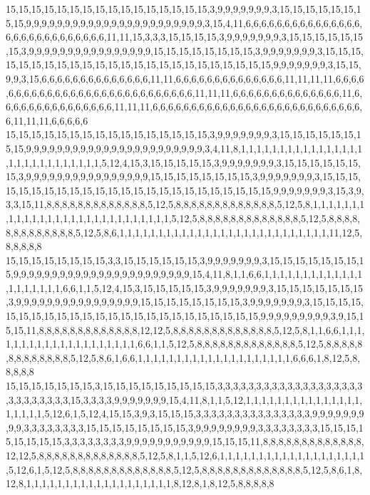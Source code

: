15,15,15,15,15,15,15,15,15,15,15,15,15,15,15,15,3,9,9,9,9,9,9,9,3,15,15,15,15,15,15,15,15,9,9,9,9,9,9,9,9,9,9,9,9,9,9,9,9,9,9,9,9,9,9,9,3,15,4,11,6,6,6,6,6,6,6,6,6,6,6,6,6,6,6,6,6,6,6,6,6,6,6,6,6,6,6,6,11,11,15,3,3,3,15,15,15,15,3,9,9,9,9,9,9,9,3,15,15,15,15,15,15,15,3,9,9,9,9,9,9,9,9,9,9,9,9,9,9,9,9,15,15,15,15,15,15,15,15,3,9,9,9,9,9,9,9,3,15,15,15,15,15,15,15,15,15,15,15,15,15,15,15,15,15,15,15,15,15,15,15,15,9,9,9,9,9,9,9,3,15,15,9,9,3,15,6,6,6,6,6,6,6,6,6,6,6,6,6,6,11,11,6,6,6,6,6,6,6,6,6,6,6,6,6,6,11,11,11,11,6,6,6,6,6,6,6,6,6,6,6,6,6,6,6,6,6,6,6,6,6,6,6,6,6,6,6,6,11,11,11,6,6,6,6,6,6,6,6,6,6,6,6,6,6,11,6,6,6,6,6,6,6,6,6,6,6,6,6,6,6,11,11,11,6,6,6,6,6,6,6,6,6,6,6,6,6,6,6,6,6,6,6,6,6,6,6,6,6,6,6,6,11,11,11,6,6,6,6,6
15,15,15,15,15,15,15,15,15,15,15,15,15,15,15,15,3,9,9,9,9,9,9,9,3,15,15,15,15,15,15,15,15,9,9,9,9,9,9,9,9,9,9,9,9,9,9,9,9,9,9,9,9,9,9,9,3,4,11,8,1,1,1,1,1,1,1,1,1,1,1,1,1,1,1,1,1,1,1,1,1,1,1,1,1,1,1,1,5,12,4,15,3,15,15,15,15,15,3,9,9,9,9,9,9,9,3,15,15,15,15,15,15,15,3,9,9,9,9,9,9,9,9,9,9,9,9,9,9,9,9,15,15,15,15,15,15,15,15,3,9,9,9,9,9,9,9,3,15,15,15,15,15,15,15,15,15,15,15,15,15,15,15,15,15,15,15,15,15,15,15,15,9,9,9,9,9,9,9,3,15,3,9,3,3,15,11,8,8,8,8,8,8,8,8,8,8,8,8,8,5,12,5,8,8,8,8,8,8,8,8,8,8,8,8,8,5,12,5,8,1,1,1,1,1,1,1,1,1,1,1,1,1,1,1,1,1,1,1,1,1,1,1,1,1,1,1,1,5,12,5,8,8,8,8,8,8,8,8,8,8,8,8,8,5,12,5,8,8,8,8,8,8,8,8,8,8,8,8,8,5,12,5,8,6,1,1,1,1,1,1,1,1,1,1,1,1,1,1,1,1,1,1,1,1,1,1,1,1,1,1,1,11,12,5,8,8,8,8,8
15,15,15,15,15,15,15,15,3,3,15,15,15,15,15,15,3,9,9,9,9,9,9,9,3,15,15,15,15,15,15,15,15,9,9,9,9,9,9,9,9,9,9,9,9,9,9,9,9,9,9,9,9,9,9,9,15,4,11,8,1,1,6,6,1,1,1,1,1,1,1,1,1,1,1,1,1,1,1,1,1,1,1,1,6,6,1,1,5,12,4,15,3,15,15,15,15,15,3,9,9,9,9,9,9,9,3,15,15,15,15,15,15,15,3,9,9,9,9,9,9,9,9,9,9,9,9,9,9,9,9,15,15,15,15,15,15,15,15,3,9,9,9,9,9,9,9,3,15,15,15,15,15,15,15,15,15,15,15,15,15,15,15,15,15,15,15,15,15,15,15,15,9,9,9,9,9,9,9,9,9,3,9,15,15,15,11,8,8,8,8,8,8,8,8,8,8,8,8,8,12,12,5,8,8,8,8,8,8,8,8,8,8,8,8,8,5,12,5,8,1,1,6,6,1,1,1,1,1,1,1,1,1,1,1,1,1,1,1,1,1,1,1,1,6,6,1,1,5,12,5,8,8,8,8,8,8,8,8,8,8,8,8,8,5,12,5,8,8,8,8,8,8,8,8,8,8,8,8,8,5,12,5,8,6,1,6,6,1,1,1,1,1,1,1,1,1,1,1,1,1,1,1,1,1,1,1,1,6,6,6,1,8,12,5,8,8,8,8,8
15,15,15,15,15,15,15,3,15,15,15,15,15,15,15,15,15,3,3,3,3,3,3,3,3,3,3,3,3,3,3,3,3,3,3,3,3,3,3,3,3,3,3,3,15,3,3,3,3,9,9,9,9,9,9,9,15,4,11,8,1,1,5,12,1,1,1,1,1,1,1,1,1,1,1,1,1,1,1,1,1,1,1,1,5,12,6,1,5,12,4,15,15,3,9,3,15,15,15,3,3,3,3,3,3,3,3,3,3,3,3,3,3,3,9,9,9,9,9,9,9,9,9,3,3,3,3,3,3,3,3,15,15,15,15,15,15,15,15,3,9,9,9,9,9,9,9,9,3,3,3,3,3,3,3,3,15,15,15,15,15,15,15,15,3,3,3,3,3,3,3,3,9,9,9,9,9,9,9,9,9,9,9,15,15,15,11,8,8,8,8,8,8,8,8,8,8,8,8,8,12,12,5,8,8,8,8,8,8,8,8,8,8,8,8,8,5,12,5,8,1,1,5,12,6,1,1,1,1,1,1,1,1,1,1,1,1,1,1,1,1,1,1,1,5,12,6,1,5,12,5,8,8,8,8,8,8,8,8,8,8,8,8,8,5,12,5,8,8,8,8,8,8,8,8,8,8,8,8,8,5,12,5,8,6,1,8,12,8,1,1,1,1,1,1,1,1,1,1,1,1,1,1,1,1,1,1,1,8,12,8,1,8,12,5,8,8,8,8,8
